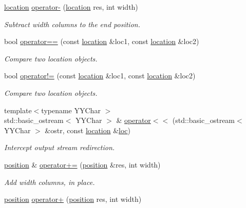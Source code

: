 \begin{DoxyCompactItemize}
\hyperlink{classyy_1_1location}{location} \hyperlink{namespaceyy_a9b8304a3c3584980893db5d974c08d01}{operator-\/} (\hyperlink{classyy_1_1location}{location} res, int width)
\begin{DoxyCompactList}\small\item\em Subtract {\itshape width} columns to the end position. \end{DoxyCompactList}\item 
bool \hyperlink{namespaceyy_a466b6e3dcf6a743bb058bf4989b38047}{operator==} (const \hyperlink{classyy_1_1location}{location} \&loc1, const \hyperlink{classyy_1_1location}{location} \&loc2)
\begin{DoxyCompactList}\small\item\em Compare two location objects. \end{DoxyCompactList}\item 
bool \hyperlink{namespaceyy_aa3a5c205bc084696bb894634ae9cce80}{operator!=} (const \hyperlink{classyy_1_1location}{location} \&loc1, const \hyperlink{classyy_1_1location}{location} \&loc2)
\begin{DoxyCompactList}\small\item\em Compare two location objects. \end{DoxyCompactList}\item 
{\footnotesize template$<$typename Y\-Y\-Char $>$ }\\std\-::basic\-\_\-ostream$<$ Y\-Y\-Char $>$ \& \hyperlink{namespaceyy_a0406f2358d6ba6b06648ff66f3508aad}{operator$<$$<$} (std\-::basic\-\_\-ostream$<$ Y\-Y\-Char $>$ \&ostr, const \hyperlink{classyy_1_1location}{location} \&\hyperlink{_genesys_09_09-scanner_8cpp_abaf70dc7df8e78acc6505d164cb2276b}{loc})
\begin{DoxyCompactList}\small\item\em Intercept output stream redirection. \end{DoxyCompactList}\item 
\hyperlink{classyy_1_1position}{position} \& \hyperlink{namespaceyy_a211eb024d7e9666b07140040b079fccc}{operator+=} (\hyperlink{classyy_1_1position}{position} \&res, int width)
\begin{DoxyCompactList}\small\item\em Add {\itshape width} columns, in place. \end{DoxyCompactList}\item 
\hyperlink{classyy_1_1position}{position} \hyperlink{namespaceyy_a23f0f414cfca1fd11ff2b779ba018038}{operator+} (\hyperlink{classyy_1_1position}{position} res, int width)

\end{DoxyCompactItemize}

